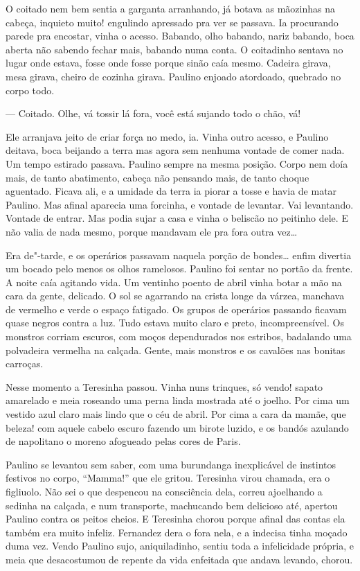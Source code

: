 O coitado nem bem sentia a garganta arranhando, já botava as mãozinhas
na cabeça, inquieto muito! engulindo apressado pra ver se passava. Ia
procurando parede pra encostar, vinha o acesso. Babando, olho babando,
nariz babando, boca aberta não sabendo fechar mais, babando numa conta.
O coitadinho sentava no lugar onde estava, fosse onde fosse porque sinão
caía mesmo. Cadeira girava, mesa girava, cheiro de cozinha girava.
Paulino enjoado atordoado, quebrado no corpo todo.

--- Coitado. Olhe, vá tossir lá fora, você está sujando todo o chão, vá!

Ele arranjava jeito de criar força no medo, ia. Vinha outro acesso, e
Paulino deitava, boca beijando a terra mas agora sem nenhuma vontade de
comer nada. Um tempo estirado passava. Paulino sempre na mesma posição.
Corpo nem doía mais, de tanto abatimento, cabeça não pensando mais, de
tanto choque aguentado. Ficava ali, e a umidade da terra ia piorar a
tosse e havia de matar Paulino. Mas afinal aparecia uma forcinha, e
vontade de levantar. Vai levantando. Vontade de entrar. Mas podia sujar
a casa e vinha o beliscão no peitinho dele. E não valia de nada mesmo,
porque mandavam ele pra fora outra vez\ldots{} 

Era de"-tarde, e os operários passavam naquela porção de bondes\ldots{} enfim
divertia um bocado pelo menos os olhos ramelosos. Paulino foi sentar no
portão da frente. A noite caía agitando vida. Um ventinho poento de
abril vinha botar a mão na cara da gente, delicado. O sol se agarrando
na crista longe da várzea, manchava de vermelho e verde o espaço
fatigado. Os grupos de operários passando ficavam quase negros contra a
luz. Tudo estava muito claro e preto, incompreensível. Os monstros
corriam escuros, com moços dependurados nos estribos, badalando uma
polvadeira vermelha na calçada. Gente, mais monstros e os cavalões nas
bonitas carroças.

Nesse momento a Teresinha passou. Vinha nuns trinques, só vendo! sapato
amarelado e meia roseando uma perna linda mostrada até o joelho. Por
cima um vestido azul claro mais lindo que o céu de abril. Por cima a
cara da mamãe, que beleza! com aquele cabelo escuro fazendo um birote
luzido, e os bandós azulando de napolitano o moreno afogueado pelas
cores de Paris.

Paulino se levantou sem saber, com uma burundanga inexplicável de
instintos festivos no corpo, ``Mamma!'' que ele gritou. Teresinha virou
chamada, era o figliuolo. Não sei o que despencou na consciência dela,
correu ajoelhando a sedinha na calçada, e num transporte, machucando bem
delicioso até, apertou Paulino contra os peitos cheios. E Teresinha
chorou porque afinal das contas ela também era muito infeliz. Fernandez
dera o fora nela, e a indecisa tinha moçado duma vez. Vendo Paulino
sujo, aniquiladinho, sentiu toda a infelicidade própria, e meia que
desacostumou de repente da vida enfeitada que andava levando, chorou.

